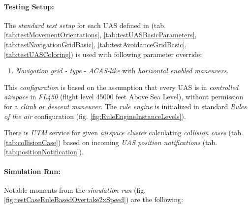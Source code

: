     \paragraph{Testing Setup:} The \emph{standard test setup} for each UAS defined in (tab. \ref{tab:testMovementOrientations}, \ref{tab:testUASBasicParameters}, \ref{tab:testNavigationGridBasic}, \ref{tab:testAvoidanceGridBasic}, \ref{tab:testUASColoring}) is used with following parameter override:
    \begin{enumerate}
        \item \emph{Navigation grid - type} - \emph{ACAS-like} with \emph{horizontal enabled maneuvers}.
    \end{enumerate}
    
    This \emph{configuration} is based on the assumption that every UAS is in \emph{controlled airspace} in \emph{FL450} (flight level 45000 feet Above Sea Level), without permission for a \emph{climb or descent maneuver}. The \emph{rule engine} is initialized in standard \emph{Rules of the air} configuration (fig. \ref{fig:RuleEngineInstanceLevels}).
    
    There is \emph{UTM} service for given \emph{airspace cluster} calculating \emph{collision cases} (tab. \ref{tab:collisionCase}) based on incoming \emph{UAS position notifications} (tab. \ref{tab:positionNotification}).
    
    
    \paragraph{Simulation Run:} Notable moments from the \emph{simulation run} (fig. \ref{fig:testCaseRuleBasedOvertake2xSpeed}) are the following:
    
